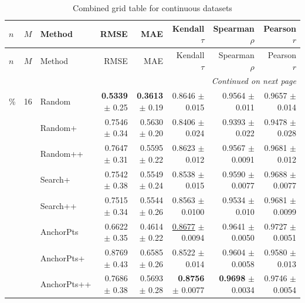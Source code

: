 \footnotesize
\setlength{\tabcolsep}{2pt}
\renewcommand{\arraystretch}{1.05}
\setlength{\LTpre}{0pt}
\setlength{\LTpost}{0pt}
\setlength{\LTleft}{\fill}
\setlength{\LTright}{\fill}
\begin{longtable}{llp{}rrrrr}
\caption{Combined grid table for continuous datasets}\label{tab:combined_grid_continuous}\\
\toprule
$n$ & $M$ & Method & RMSE & MAE & Kendall $\tau$ & Spearman $\rho$ & Pearson $r$ \\
\midrule
\endfirsthead
\toprule
$n$ & $M$ & Method & RMSE & MAE & Kendall $\tau$ & Spearman $\rho$ & Pearson $r$ \\
\midrule
\endhead
\midrule
\multicolumn{8}{r}{\emph{Continued on next page}} \\
\midrule
\endfoot
\bottomrule
\endlastfoot
5\% & 16 & Random & \textbf{0.5339} {\scriptsize $\pm$ 0.25} & \textbf{0.3613} {\scriptsize $\pm$ 0.19} & 0.8646 {\scriptsize $\pm$ 0.015} & 0.9564 {\scriptsize $\pm$ 0.011} & 0.9657 {\scriptsize $\pm$ 0.014} \\
 &  & Random+ & 0.7546 {\scriptsize $\pm$ 0.34} & 0.5630 {\scriptsize $\pm$ 0.20} & 0.8406 {\scriptsize $\pm$ 0.024} & 0.9393 {\scriptsize $\pm$ 0.022} & 0.9478 {\scriptsize $\pm$ 0.028} \\
 &  & Random++ & 0.7647 {\scriptsize $\pm$ 0.31} & 0.5595 {\scriptsize $\pm$ 0.22} & 0.8623 {\scriptsize $\pm$ 0.012} & 0.9567 {\scriptsize $\pm$ 0.0091} & 0.9681 {\scriptsize $\pm$ 0.012} \\
 &  & Search+ & 0.7542 {\scriptsize $\pm$ 0.38} & 0.5549 {\scriptsize $\pm$ 0.24} & 0.8538 {\scriptsize $\pm$ 0.015} & 0.9590 {\scriptsize $\pm$ 0.0077} & 0.9688 {\scriptsize $\pm$ 0.0077} \\
 &  & Search++ & 0.7515 {\scriptsize $\pm$ 0.34} & 0.5544 {\scriptsize $\pm$ 0.26} & 0.8563 {\scriptsize $\pm$ 0.0100} & 0.9534 {\scriptsize $\pm$ 0.010} & 0.9681 {\scriptsize $\pm$ 0.0099} \\
 &  & AnchorPts & 0.6622 {\scriptsize $\pm$ 0.35} & 0.4614 {\scriptsize $\pm$ 0.22} & \underline{0.8677} {\scriptsize $\pm$ 0.0094} & 0.9641 {\scriptsize $\pm$ 0.0050} & 0.9727 {\scriptsize $\pm$ 0.0051} \\
 &  & AnchorPts+ & 0.8769 {\scriptsize $\pm$ 0.43} & 0.6585 {\scriptsize $\pm$ 0.26} & 0.8522 {\scriptsize $\pm$ 0.014} & 0.9604 {\scriptsize $\pm$ 0.0058} & 0.9580 {\scriptsize $\pm$ 0.013} \\
 &  & AnchorPts++ & 0.7686 {\scriptsize $\pm$ 0.38} & 0.5693 {\scriptsize $\pm$ 0.28} & \textbf{0.8756} {\scriptsize $\pm$ 0.0077} & \textbf{0.9698} {\scriptsize $\pm$ 0.0034} & 0.9746 {\scriptsize $\pm$ 0.0054} \\

\end{longtable}
